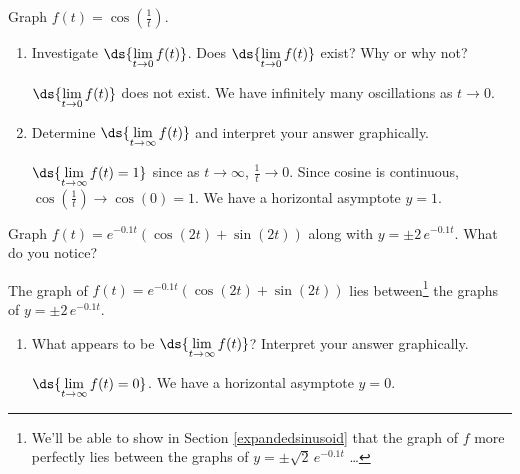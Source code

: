\documentclass{ximera}
\begin{document}
\begin{question}
\begin{problem}
\begin{enumerate}
\end{enumerate}

\end{problem}


\begin{problem}
Graph $f(t) = \cos\left(\frac{1}{t}\right)$.  

\begin{enumerate}

\item Investigate  $\ds{\lim_{t \rightarrow 0} f(t)}$.  Does $\ds{\lim_{t \rightarrow 0} f(t)}$ exist?  Why or why not?

\begin{solution}
    $\ds{\lim_{t \rightarrow 0} f(t)}$ does not exist.  We have infinitely many oscillations as $t \rightarrow 0$.
\end{solution}

\item  Determine $\ds{\lim_{t \rightarrow \infty} f(t)}$ and interpret your answer graphically.

\begin{solution}
    $\ds{\lim_{t \rightarrow \infty} f(t) = 1}$ since as $t \rightarrow \infty$, $\frac{1}{t} \rightarrow 0$.  Since cosine is continuous, $\cos\left(\frac{1}{t}\right) \rightarrow \cos(0) =  1$. We have a horizontal asymptote $y = 1$.
\end{solution}

\end{enumerate}
\end{problem}

\begin{problem}  \label{exploregraphslast}
Graph $f(t) = e^{-0.1t} \left( \cos(2t) + \sin(2t)\right)$ along with $y = \pm 2 \, e^{-0.1t}$. What do you notice?  

\begin{solution}
The graph of  $f(t) = e^{-0.1t} \left( \cos(2t) + \sin(2t)\right)$ lies between\footnote{We'll be able to show in Section \ref{expandedsinusoid} that the graph of $f$ more perfectly lies between the graphs of $y = \pm \sqrt{2} \, e^{-0.1 t}$ \ldots}  the graphs of $y = \pm 2 \, e^{-0.1t}$.
\end{solution}

\begin{enumerate}

\item What appears to be $\ds{\lim_{t \rightarrow \infty} f(t)}$?   Interpret your answer graphically.

\begin{solution}
    $\ds{\lim_{t \rightarrow \infty} f(t) = 0}$.   We have a horizontal asymptote $y = 0$.
\end{solution}


\end{enumerate}
\end{problem}
\end{question}
\end{document}
